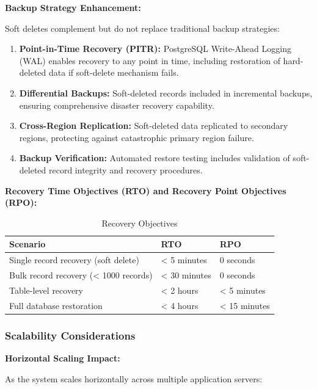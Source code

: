 \documentclass[12pt,a4paper]{article}
\begin{document}
\textbf{Backup Strategy Enhancement:}

Soft deletes complement but do not replace traditional backup strategies:

\begin{enumerate}[leftmargin=2em, itemsep=6pt]
    \item \textbf{Point-in-Time Recovery (PITR):} PostgreSQL Write-Ahead Logging (WAL) enables recovery to any point in time, including restoration of hard-deleted data if soft-delete mechanism fails.
    \item \textbf{Differential Backups:} Soft-deleted records included in incremental backups, ensuring comprehensive disaster recovery capability.
    \item \textbf{Cross-Region Replication:} Soft-deleted data replicated to secondary regions, protecting against catastrophic primary region failure.
    \item \textbf{Backup Verification:} Automated restore testing includes validation of soft-deleted record integrity and recovery procedures.
\end{enumerate}

\vspace{0.5em}

\textbf{Recovery Time Objectives (RTO) and Recovery Point Objectives (RPO):}

\begin{table}[H]
\centering
\begin{tabular}{|p{5cm}|p{3cm}|p{3cm}|}
\hline
\textbf{Scenario} & \textbf{RTO} & \textbf{RPO} \\
\hline
Single record recovery (soft delete) & < 5 minutes & 0 seconds \\
\hline
Bulk record recovery (< 1000 records) & < 30 minutes & 0 seconds \\
\hline
Table-level recovery & < 2 hours & < 5 minutes \\
\hline
Full database restoration & < 4 hours & < 15 minutes \\
\hline
\end{tabular}
\caption{Recovery Objectives}
\end{table}

\subsubsection{Scalability Considerations}

\textbf{Horizontal Scaling Impact:}

As the system scales horizontally across multiple application servers:
\end{document}
